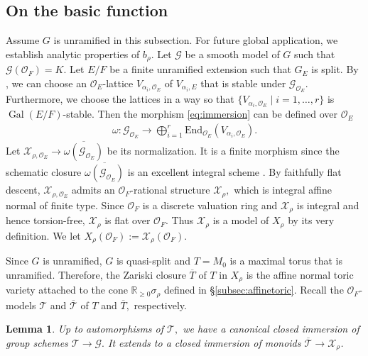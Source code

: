 \documentclass[10pt]{amsart}
\newtheorem{lemma}[theorem]{Lemma}
\theoremstyle{definition}
\numberwithin{equation}{section}
\DeclareMathOperator{\Gal}{\mathrm{Gal}}
\numberwithin{equation}{subsection}
\newcommand{\RR}{\mathbb{R}}
\begin{document}
\subsection{On the basic function}
Assume $G$ is unramified in this subsection. For future global application, we establish analytic properties of $b_\rho$. Let $\mathcal{G}$ be a smooth model of $G$ such that $\mathcal{G}(\mathcal{O}_F)=K$.  Let $E/F$ be a finite unramified extension such that $G_E$ is split. By \cite[I.10.4]{Jantzen:Reps}, we can choose an $\mathcal{O}_E$-lattice $V_{\alpha_i,\mathcal{O}_{E}}$ of $V_{\alpha_i,E}$ that is stable under $\mathcal{G}_{\mathcal{O}_E}$. Furthermore, we choose the lattices in a way so that $\{V_{\alpha_i,\mathcal{O}_{E}}\mid i=1,\ldots,r\}$ is $\Gal(E/F)$-stable. Then the morphism \eqref{eq:immersion} can be defined over $\mathcal{O}_E$ 
\begin{align*}
    \omega:\mathcal{G}_{\mathcal{O}_E}\longrightarrow \bigoplus_{i=1}^r\mathrm{End}_{\mathcal{O}_E}(V_{\alpha_i,\mathcal{O}_E}).
\end{align*}
Let $\mathcal{X}_{\rho,\mathcal{O}_E}\longrightarrow\overline{\omega(\mathcal{G}_{\mathcal{O}_E})}$ be its normalization. It is a finite morphism since the schematic closure $\overline{\omega(\mathcal{G}_{\mathcal{O}_E})}$ is an excellent integral scheme \cite[\href{https://stacks.math.columbia.edu/tag/07QW}{Tag 07QW}]{stacks-project}. By faithfully flat descent, $\mathcal{X}_{\rho,\mathcal{O}_E}$ admits an $\mathcal{O}_F$-rational structure $\mathcal{X}_\rho,$ which is integral affine normal of finite type.  Since $\mathcal{O}_F$ is a discrete valuation ring and $\mathcal{X}_\rho$ is integral and hence torsion-free, $\mathcal{X}_\rho$ is flat over $\mathcal{O}_F$. Thus $\mathcal{X}_\rho$ is a model of $X_\rho$ by its very definition. We let $X_\rho(\mathcal{O}_F):=\mathcal{X}_\rho(\mathcal{O}_F).$ 

Since $G$ is unramified, $G$ is quasi-split and $T=M_0$ is a maximal torus that is unramified. Therefore, the Zariski closure $\overline{T}$ of $T$ in $X_\rho$ is the affine normal toric variety attached to the cone $\RR_{\ge 0}\sigma_\rho$ defined in \S \ref{subsec:affinetoric}. Recall the $\mathcal{O}_F$-models $\mathcal{T}$ and $\overline{\mathcal{T}}$ of $T$ and $\overline{T},$ respectively.


\begin{lemma}\label{lem:modelmap}
 Up to automorphisms of $\mathcal{T},$ we have a canonical closed immersion of group schemes $\mathcal{T}\longrightarrow \mathcal{G}.$ It extends to a closed immersion of monoids $\overline{\mathcal{T}}\longrightarrow\mathcal{X}_\rho$.
\end{lemma}
\end{document}
